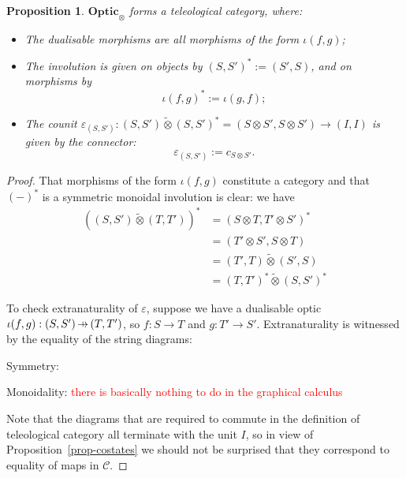 \documentclass[11pt,a4paper]{article}
\theoremstyle{plain}
\newtheorem{proposition}[theorem]{Proposition}
\theoremstyle{definition}
\newcommand{\C}{\mathscr{C}}
\newcommand{\Optic}{\mathbf{Optic}}
\newcommand{\switched}{\mathbin{\tilde{\otimes}}}
\newcommand{\hto}{\ensuremath{\,\mathaccent\shortmid\rightarrow\,}}
\newcommand{\todo}[1]{\textcolor{red}{\small #1}}
\begin{document}
\begin{proposition}
  $\Optic_\otimes$ forms a teleological category, where:
  \begin{itemize}
  \item The dualisable morphisms are all morphisms of the form $\iota(f, g)$;
  \item The involution is given on objects by ${(S, S')}^* := (S', S)$, and on morphisms by \[\iota{(f, g)}^* := \iota(g, f);\]
  \item The counit $\varepsilon_{(S, S')} : (S, S') \switched {(S, S')}^* = (S \otimes S', S \otimes S') \to (I, I)$ is given by the connector: \[\varepsilon_{(S, S')} := c_{S \otimes S'}.\]
  \end{itemize}
\end{proposition}
\begin{proof}
  That morphisms of the form $\iota(f, g)$ constitute a category and that ${(-)}^*$ is a symmetric monoidal involution is clear: we have
  \begin{align*}
    \left( (S, S') \switched (T, T') \right)^*
    &= \left( S \otimes T, T' \otimes S' \right)^* \\
    &= \left(T' \otimes S', S \otimes T  \right) \\
    &= (T', T) \switched (S', S) \\
    &= (T, T')^* \switched (S, S')^*
  \end{align*}

  To check extranaturality of $\varepsilon$, suppose we have a dualisable optic $\iota(f, g) : (S, S') \hto (T, T')$, so $f : S \to T$ and $g : T' \to S'$. Extranaturality is witnessed by the equality of the string diagrams:
  \begin{center}
    
    \qquad \raisebox{1.5cm}{$=$} \qquad
    
  \end{center}
  Symmetry:
  \begin{center}
    
    \qquad \raisebox{1.5cm}{$=$} \qquad
    
  \end{center}
  Monoidality: \todo{there is basically nothing to do in the graphical calculus}

  Note that the diagrams that are required to commute in the definition of teleological category all terminate with the unit $I$, so in view of Proposition~\ref{prop-costates} we should not be surprised that they correspond to equality of maps in $\C$.
\end{proof}
\end{document}
